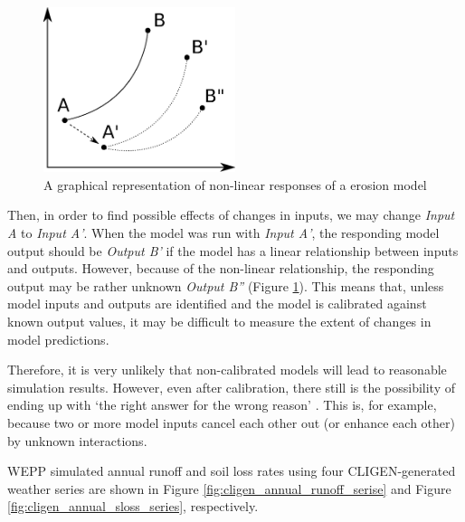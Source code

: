 \begin{figure}[htbp]
  \centering
    \includegraphics[width=0.5\textwidth]{./img/calibration}
  \caption{A graphical representation of non-linear responses of a erosion
model}
  \label{fig:calibration}
\end{figure}

Then, in order to find possible effects of changes in inputs, we may change
\emph{Input A} to \emph{Input A'}. When the model was run with \emph{Input A'},
the responding model output should be \emph{Output B'} if the model has a linear
relationship between inputs and outputs. However, because of the non-linear
relationship, the responding output may be rather unknown \emph{Output B''}
(Figure \ref{fig:calibration}). This means that, unless model inputs and outputs
are identified and the model is calibrated against known output values, it may
be difficult to measure the extent of changes in model predictions.

Therefore, it is very unlikely that non-calibrated models will lead to
reasonable simulation results. However, even after calibration, there still is
the possibility of ending up with `the right answer for the wrong reason'
\citep{favis-mortlock1994-use}. This is, for example, because two or more model
inputs cancel each other out (or enhance each other) by unknown interactions.

WEPP simulated annual runoff and soil loss rates using four CLIGEN-generated
weather series are shown in Figure \ref{fig:cligen_annual_runoff_serise} and
Figure \ref{fig:cligen_annual_sloss_series}, respectively.

